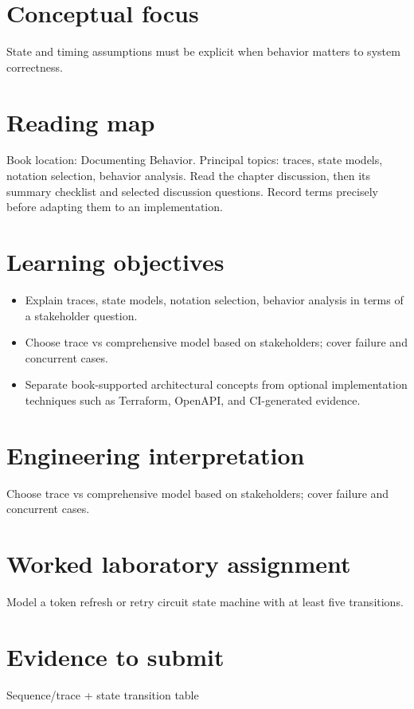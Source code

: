 \documentclass[10pt,letterpaper]{article}
\begin{document}
\DocProvenance
\section{Conceptual focus}
State and timing assumptions must be explicit when behavior matters to system correctness.

\section{Reading map}
Book location: Documenting Behavior. Principal topics: traces, state models, notation selection, behavior analysis. Read the chapter discussion, then its summary checklist and selected discussion questions. Record terms precisely before adapting them to an implementation.

\section{Learning objectives}
\begin{itemize}
\item Explain traces, state models, notation selection, behavior analysis in terms of a stakeholder question.
\item Choose trace vs comprehensive model based on stakeholders; cover failure and concurrent cases.
\item Separate book-supported architectural concepts from optional implementation techniques such as Terraform, OpenAPI, and CI-generated evidence.
\end{itemize}
\section{Engineering interpretation}
Choose trace vs comprehensive model based on stakeholders; cover failure and concurrent cases.

\section{Worked laboratory assignment}
Model a token refresh or retry circuit state machine with at least five transitions.

\section{Evidence to submit}
Sequence/trace + state transition table
\end{document}
